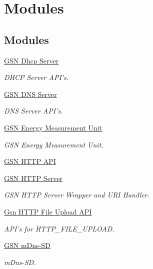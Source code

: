 \hypertarget{a00685}{
\section{Modules}
\label{a00685}
}
\subsection*{Modules}
\begin{DoxyCompactItemize}
\item 
\hyperlink{a00661}{GSN Dhcp Server}


\begin{DoxyCompactList}\small\item\em DHCP Server API's. \end{DoxyCompactList}

\item 
\hyperlink{a00662}{GSN DNS Server}


\begin{DoxyCompactList}\small\item\em DNS Server API's. \end{DoxyCompactList}

\item 
\hyperlink{a00663}{GSN Energy Measurement Unit}


\begin{DoxyCompactList}\small\item\em GSN Energy Measurement Unit. \end{DoxyCompactList}

\item 
\hyperlink{a00665}{GSN HTTP API}
\item 
\hyperlink{a00666}{GSN HTTP Server}


\begin{DoxyCompactList}\small\item\em GSN HTTP Server Wrapper and URI Handler. \end{DoxyCompactList}

\item 
\hyperlink{a00667}{Gsn HTTP File Upload API}


\begin{DoxyCompactList}\small\item\em API's for HTTP\_\-FILE\_\-UPLOAD. \end{DoxyCompactList}

\item 
\hyperlink{a00668}{GSN mDns-\/SD}


\begin{DoxyCompactList}\small\item\em mDns-\/SD. \end{DoxyCompactList}


\end{DoxyCompactItemize}
